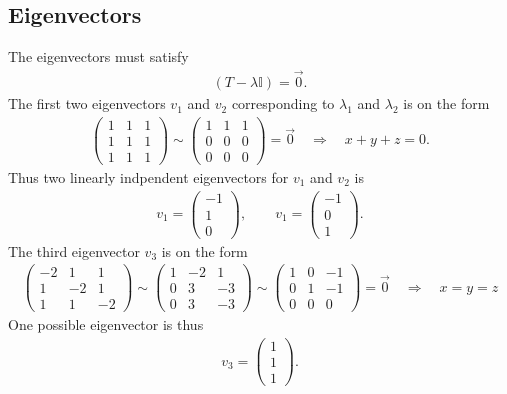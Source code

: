 \documentclass[reprint, amsmath, amssymb, aps, onecolumn]{revtex4-2}
\begin{document}
{{\subsection{Eigenvectors}\label{sec:T_eigvec}
The eigenvectors must satisfy 
\begin{align*}
  (T - \lambda \mathbb{I} ) = \vec{0}.
\end{align*}
The first two eigenvectors $v_1$ and $v_2$ corresponding to $\lambda_1$ and $\lambda_2$ is on the form
\begin{align*}
  \begin{pmatrix}
    1 & 1 & 1 \\
    1 & 1 & 1 \\
    1 & 1 & 1
  \end{pmatrix} 
  \sim
  \begin{pmatrix}
    1 & 1 & 1 \\
    0 & 0 & 0 \\
    0 & 0 & 0
  \end{pmatrix} 
  = \vec{0} \quad 
  \Rightarrow \quad 
  x + y + z = 0.
\end{align*} 
Thus two linearly indpendent eigenvectors for $v_1$ and $v_2$ is 
\begin{align*}
  v_1 = \begin{pmatrix} -1 \\ 1 \\ 0 \end{pmatrix}, \qquad 
  v_1 = \begin{pmatrix} -1 \\ 0 \\ 1 \end{pmatrix}.
\end{align*}
The third eigenvector $v_3$ is on the form
\begin{align*}
  \begin{pmatrix}
    -2 & 1 & 1 \\
    1 & -2 & 1 \\
    1 & 1 & -2
  \end{pmatrix} 
  \sim
  \begin{pmatrix}
    1 & -2 & 1 \\
    0 & 3 & -3 \\
    0 & 3 & -3
  \end{pmatrix} 
  \sim
  \begin{pmatrix}
    1 & 0 & -1 \\
    0 & 1 & -1 \\
    0 & 0 & 0
  \end{pmatrix} 
  = \vec{0} \quad
  \Rightarrow \quad 
  x = y = z
\end{align*}
One possible eigenvector is thus 
\begin{align*}
  v_3 = \begin{pmatrix} 1 \\ 1 \\ 1 \end{pmatrix}.
\end{align*}

}}
\end{document}
